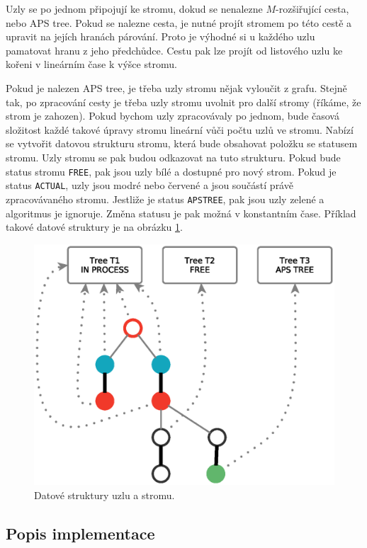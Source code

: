 \documentclass[a4paper, 11pt, titlepage, final]{article}[3. prosinec 2011]
\begin{document}
Uzly se po jednom připojují ke stromu, dokud se nenalezne $M$-rozšiřující cesta, nebo APS tree. Pokud se nalezne cesta, je nutné projít stromem po této cestě a upravit na jejích hranách párování. Proto je výhodné si u každého uzlu pamatovat hranu z jeho předchůdce. Cestu pak lze projít od listového uzlu ke kořeni v lineárním čase k výšce stromu. 

Pokud je nalezen APS tree, je třeba uzly stromu nějak vyloučit z grafu. Stejně tak, po zpracování cesty je třeba uzly stromu uvolnit pro další stromy (říkáme, že strom je zahozen). Pokud bychom uzly zpracovávaly po jednom, bude časová složitost každé takové úpravy stromu lineární vůči počtu uzlů ve stromu. Nabízí se vytvořit datovou strukturu stromu, která bude obsahovat položku se statusem stromu. Uzly stromu se pak budou odkazovat na tuto strukturu. Pokud bude status stromu \texttt{FREE}, pak jsou uzly bílé a dostupné pro nový strom. Pokud je status \texttt{ACTUAL}, uzly jsou modré nebo červené a jsou součástí právě zpracovávaného stromu. Jestliže je status \texttt{APSTREE}, pak jsou uzly zelené a algoritmus je ignoruje. Změna statusu je pak možná v konstantním čase. Příklad takové datové struktury je na obrázku \ref{imgStructure}.

\begin{figure}[ht]
  \centering
  \includegraphics[scale=0.5]{img/implementation.eps}
  \caption{Datové struktury uzlu a stromu.}
  \label{imgStructure}
\end{figure}

\subsection{Popis implementace}
\end{document}
